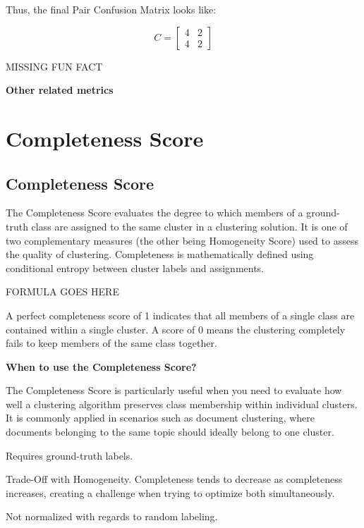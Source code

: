Thus, the final Pair Confusion Matrix looks like:
\begin{center}
    \[
        C =
        \begin{bmatrix}
            4 & 2 \\
            4 & 2
        \end{bmatrix}
    \]
\end{center}

{MISSING FUN FACT}


\textbf{Other related metrics}

\clearpage
\thispagestyle{clusteringstyle}
\section{Completeness Score}
\subsection{Completeness Score}

The Completeness Score evaluates the degree to which members of a ground-truth class are assigned to the same cluster in a
clustering solution. It is one of two complementary measures (the other being Homogeneity Score) used to assess the quality of
clustering. Completeness is mathematically defined using conditional entropy between cluster labels and assignments.


\begin{center}
    FORMULA GOES HERE
\end{center}

A perfect completeness score of 1 indicates that all members of a single class are contained within a single cluster. 
A score of 0 means the clustering completely fails to keep members of the same class together.

\textbf{When to use the Completeness Score?}

The Completeness Score is particularly useful when you need to evaluate how well a clustering algorithm preserves class membership
within individual clusters. It is commonly applied in scenarios such as document clustering, where documents belonging to the same
topic should ideally belong to one cluster.

{
    \item Requires ground-truth labels.
    \item Trade-Off with Homogeneity. Completeness tends to decrease as completeness increases, creating a challenge when
    trying to optimize both simultaneously.
    \item Not normalized with regards to random labeling.
}

